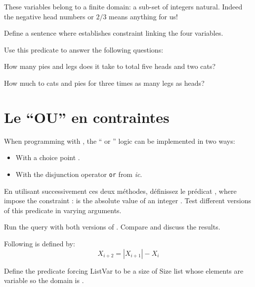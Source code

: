 These variables belong to a finite domain: a sub-set of integers
natural. Indeed the negative head numbers or $2/3$ means anything for us!

Define a sentence  where  establishes
constraint linking the four variables.

Use this predicate to answer the following questions:
\begin{question}
How many pies and legs does it take to total five heads and two cats?
\end{question}

\begin{question}
How much to cats and pies for three times as many legs as
heads?
\end{question}

\section{Le ``OU'' en contraintes}
\label{sec:suite-periodique}
When programming with , the `` or '' logic can be implemented in two ways:

\begin{itemize}
\item With a choice point \prolog{}.
\item With the disjunction operator \verb|or| from \emph{ic}.
\end{itemize}


\begin{question}
En utilisant successivement ces deux méthodes, définissez   le   prédicat  ,   where
 impose the constraint  :  is the absolute value of an integer .
Test different versions of this predicate in varying arguments.\end{question}

\begin{question}\label{QC5}
Run the query  with both versions of . Compare and discuss the results.
\end{question}


Following is defined by:
\begin{displaymath}
    X_{i+2} = |X_{i+1}| - X_i
\end{displaymath}

\begin{question}

Define the predicate  forcing ListVar to be a size of Size list whose elements are variable  so the domain is  .
\end{question}


